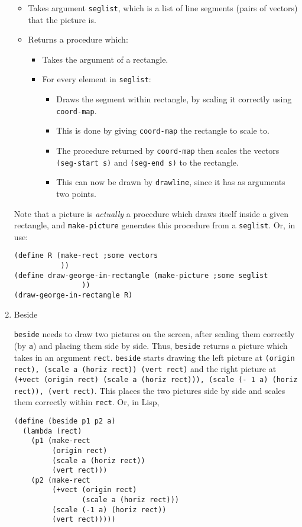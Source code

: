 \documentclass[9pt]{report}
\begin{document}
\begin{enumerate}
\begin{itemize}
\item Takes argument \texttt{seglist}, which is a list of line segments
(pairs of vectors) that the picture is.
\item Returns a procedure which:
\begin{itemize}
\item Takes the argument of a rectangle.
\item For every element in \texttt{seglist}:
\begin{itemize}
\item Draws the segment within rectangle, by scaling it correctly
using \texttt{coord-map}.
\item This is done by giving \texttt{coord-map} the rectangle to scale
to.
\item The procedure returned by \texttt{coord-map} then scales the
vectors \texttt{(seg-start s)} and \texttt{(seg-end s)} to the rectangle.
\item This can now be drawn by \texttt{drawline}, since it has as
arguments two points.
\end{itemize}
\end{itemize}
\end{itemize}

Note that a picture is \emph{actually} a procedure which draws itself
inside a given rectangle, and \texttt{make-picture} generates this
procedure from a \texttt{seglist}. Or, in use:

\begin{verbatim}
(define R (make-rect ;some vectors
           ))
(define draw-george-in-rectangle (make-picture ;some seglist
                ))
(draw-george-in-rectangle R)
\end{verbatim}

\item Beside
\label{sec:org959e9f1}

\texttt{beside} needs to draw two pictures on the screen, after scaling
them correctly (by \texttt{a}) and placing them side by side. Thus,
\texttt{beside} returns a picture which takes in an argument \texttt{rect}.
\texttt{beside} starts drawing the left picture at \texttt{(origin rect),
     (scale a (horiz rect)) (vert rect)} and the right picture at
\texttt{(+vect (origin rect) (scale a (horiz rect))), (scale (- 1 a)
     (horiz rect)), (vert rect)}. This places the two pictures side by
side and scales them correctly within \texttt{rect}. Or, in Lisp,

\begin{verbatim}
(define (beside p1 p2 a)
  (lambda (rect)
    (p1 (make-rect
         (origin rect)
         (scale a (horiz rect))
         (vert rect)))
    (p2 (make-rect
         (+vect (origin rect)
                (scale a (horiz rect)))
         (scale (-1 a) (horiz rect))
         (vert rect)))))
\end{verbatim}


\end{enumerate}
\end{document}
